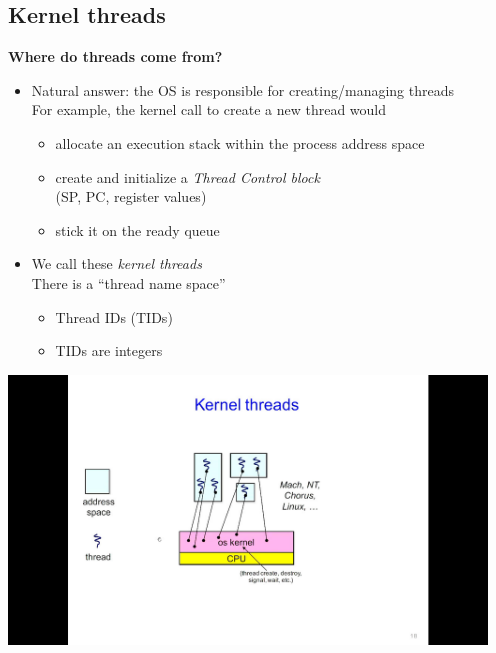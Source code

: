 \documentclass[11pt,a4paper]{article}
\begin{document}
\subsection{Kernel threads}

\textbf{Where do threads come from?}
\begin{itemize}
    \item Natural answer: the OS is responsible for creating/managing threads \\
        For example, the kernel call to create a new thread would
        \begin{itemize}
            \item allocate an execution stack within the process address space
            \item create and initialize a \emph{Thread Control block} \\
                (SP, PC, register values)
            \item stick it on the ready queue
        \end{itemize}
    \item We call these \emph{kernel threads} \\
        There is a ``thread name space''
        \begin{itemize}
            \item Thread IDs (TIDs)
            \item TIDs are integers
        \end{itemize}
\end{itemize}

\includegraphics[height=270]{kernel-threads.jpg}
\end{document}
